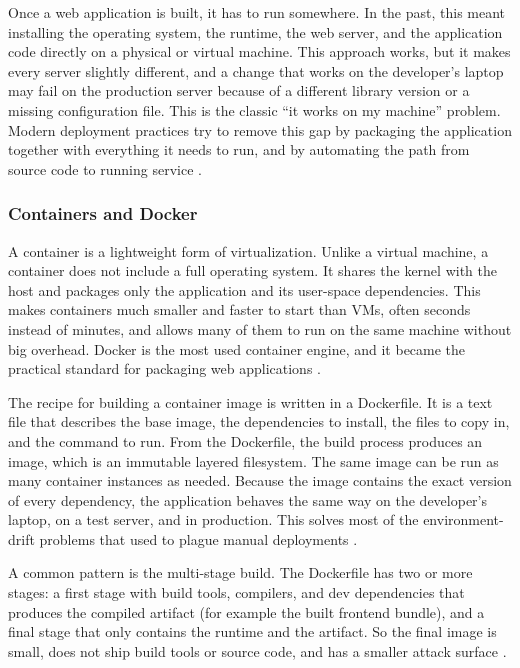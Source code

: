 Once a web application is built, it has to run somewhere. In the past, this meant installing the operating system, the runtime, the web server, and the application code directly on a physical or virtual machine. This approach works, but it makes every server slightly different, and a change that works on the developer's laptop may fail on the production server because of a different library version or a missing configuration file. This is the classic \enquote{it works on my machine} problem. Modern deployment practices try to remove this gap by packaging the application together with everything it needs to run, and by automating the path from source code to running service \autocite{prasetyo2021docker_web, galhotra2025containerization}.

\subsubsection{Containers and Docker}
\label{sec:containers}

A container is a lightweight form of virtualization. Unlike a virtual machine, a container does not include a full operating system. It shares the kernel with the host and packages only the application and its user-space dependencies. This makes containers much smaller and faster to start than VMs, often seconds instead of minutes, and allows many of them to run on the same machine without big overhead. Docker is the most used container engine, and it became the practical standard for packaging web applications \autocite{galhotra2025containerization, silva2024docker_lxd, rivera2018containers}.

The recipe for building a container image is written in a Dockerfile. It is a text file that describes the base image, the dependencies to install, the files to copy in, and the command to run. From the Dockerfile, the build process produces an image, which is an immutable layered filesystem. The same image can be run as many container instances as needed. Because the image contains the exact version of every dependency, the application behaves the same way on the developer's laptop, on a test server, and in production. This solves most of the environment-drift problems that used to plague manual deployments \autocite{prasetyo2021docker_web, galhotra2025containerization}.

A common pattern is the multi-stage build. The Dockerfile has two or more stages: a first stage with build tools, compilers, and dev dependencies that produces the compiled artifact (for example the built frontend bundle), and a final stage that only contains the runtime and the artifact. So the final image is small, does not ship build tools or source code, and has a smaller attack surface \autocite{galhotra2025containerization, list2018dockercompose}.

